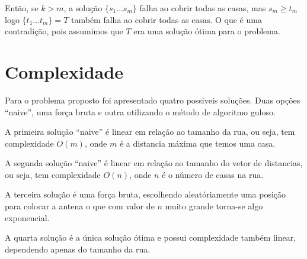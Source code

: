 \documentclass[11pt]{article}
\begin{document}
Então, se $k>m$, a solução $\{ s_1 \ldots s_m \}$ falha ao cobrir
todas as casas, mas $s_m \geq t_m$ logo $\{ t_1 \ldots t_m \} = T$
também falha ao cobrir todas as casas. O que é uma contradição, pois
assumimos que $T$ era uma solução ótima para o problema.


\section{Complexidade}
\label{sec-4}
\label{sec-5}

Para o problema proposto foi apresentado quatro possiveis
soluções. Duas opções ``naive'', uma força bruta e outra utilizando o
método de algoritmo guloso.

A primeira solução ``naive'' é linear em relação ao tamanho da rua, ou
seja, tem complexidade $O(m)$, onde $m$ é a distancia máxima que temos
uma casa.

A segunda solução ``naive'' é linear em relação ao tamanho do vetor de
distancias, ou seja, tem complexidade $O(n)$, onde $n$ é o número de
casas na rua.

A terceira solução é uma força bruta, escolhendo aleatóriamente uma
posição para colocar a antena o que com valor de $n$ muito grande
torna-se algo exponencial.

A quarta solução é a única solução ótima e possui complexidade também
linear, dependendo apenas do tamanho da rua.
\end{document}
